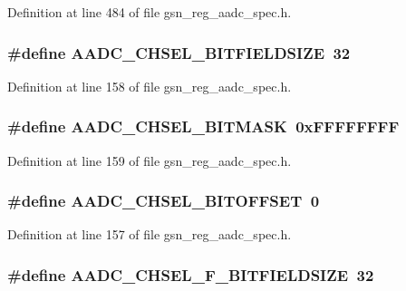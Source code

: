 Definition at line 484 of file gsn\_\-reg\_\-aadc\_\-spec.h.

\hypertarget{a00543_a79f8bdf8c6e19b0670dbbe77ef044f10}{
\subsubsection[{AADC\_\-CHSEL\_\-BITFIELDSIZE}]{\setlength{\rightskip}{0pt plus 5cm}\#define AADC\_\-CHSEL\_\-BITFIELDSIZE~32}}
\label{a00543_a79f8bdf8c6e19b0670dbbe77ef044f10}


Definition at line 158 of file gsn\_\-reg\_\-aadc\_\-spec.h.

\hypertarget{a00543_a3884692e3a68b3c3ba453cb3a9cfadcc}{
\subsubsection[{AADC\_\-CHSEL\_\-BITMASK}]{\setlength{\rightskip}{0pt plus 5cm}\#define AADC\_\-CHSEL\_\-BITMASK~0xFFFFFFFF}}
\label{a00543_a3884692e3a68b3c3ba453cb3a9cfadcc}


Definition at line 159 of file gsn\_\-reg\_\-aadc\_\-spec.h.

\hypertarget{a00543_ad3bf6abb008d5e435605e085318b6a73}{
\subsubsection[{AADC\_\-CHSEL\_\-BITOFFSET}]{\setlength{\rightskip}{0pt plus 5cm}\#define AADC\_\-CHSEL\_\-BITOFFSET~0}}
\label{a00543_ad3bf6abb008d5e435605e085318b6a73}


Definition at line 157 of file gsn\_\-reg\_\-aadc\_\-spec.h.

\hypertarget{a00543_a15de6abf133b5a0f23b1d80a307c1be2}{
\subsubsection[{AADC\_\-CHSEL\_\-F\_\-BITFIELDSIZE}]{\setlength{\rightskip}{0pt plus 5cm}\#define AADC\_\-CHSEL\_\-F\_\-BITFIELDSIZE~32}}
\label{a00543_a15de6abf133b5a0f23b1d80a307c1be2}


